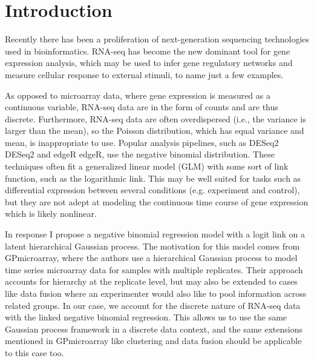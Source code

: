 \documentclass[11pt]{article}
\newcommand{\1}{\mathbf{1}}
\newcommand{\0}{\mathbf{0}}
\begin{document}
\section{Introduction}
Recently there has been a proliferation of next-generation sequencing technologies used in bioinformatics. RNA-seq has become the new dominant tool for gene expression analysis, which may be used to infer gene regulatory networks and measure cellular response to external stimuli, to name just a few examples.  \cite{PG} \cite{NBregression}

As opposed to microarray data, where gene expression is measured as a continuous variable, RNA-seq data are in the form of counts and are thus discrete. Furthermore, RNA-seq data are often overdispersed (i.e., the variance is larger than the mean), so the Poisson distribution, which has equal variance and mean, is inappropriate to use. Popular analysis pipelines, such as DESeq2 {DESeq2} and edgeR {edgeR}, use the negative binomial distribution. These techniques often fit a generalized linear model (GLM) with some sort of link function, such as the logarithmic link. This may be well suited for tasks such as differential expression between several conditions (e.g. experiment and control), but they are not adept at modeling the continuous time course of gene expression which is likely nonlinear.

In response I propose a negative binomial regression model with a logit link on a latent hierarchical Gaussian process. The motivation for this model comes from {GPmicroarray}, where the authors use a hierarchical Gaussian process to model time series microarray data for samples with multiple replicates. Their approach accounts for hierarchy at the replicate level, but may also be extended to cases like data fusion where an experimenter would also like to pool information across related groups. In our case, we account for the discrete nature of RNA-seq data with the linked negative binomial regression. This allows us to use the same Gaussian process framework in a discrete data context, and the same extensions mentioned in {GPmicroarray} like clustering and data fusion should be applicable to this case too.

\end{document}
